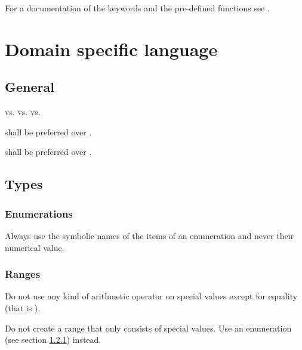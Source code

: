 \documentclass[draft]{efsguide}
\begin{document}
For a documentation of the keywords and the pre-defined functions see \cite{efstechdesign}.



\chapter{Domain specific language}

\section{General}
\begin{rules}
\item {}  vs.  vs. \code{[]} vs.  
\item {} shall be preferred over . 
\item {} shall be preferred over . 
\end{rules}

\section{Types}
\subsection{Enumerations}
\label{sec:enumeration}
\begin{rules}
\item Always use the symbolic names of the items of an enumeration and never their numerical value. 
\end{rules}

\subsection{Ranges}
\begin{rules}
\item Do not use any kind of arithmetic operator on special values except for equality (that is \code{==}). 
\item Do not create a range that only consists of special values. Use an enumeration (see section \ref{sec:enumeration}) instead. 
\end{rules}
\end{document}

